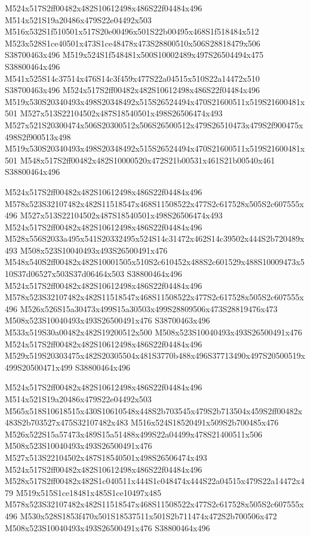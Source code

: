 \documentclass{article}
\begin{document}
\begin{multicols}{2}
M524x517S2ff00482x482S10612498x486S22f04484x496 M514x521S19a20486x479S22e04492x503 M516x532S1f510501x517S20e00496x501S22b00495x468S1f518484x512 M523x528S1ce40501x473S1ce48478x473S28800510x506S28818479x506 S38700463x496 M519x524S1f548481x500S10002489x497S26504494x475 S38800464x496 M541x525S14c37514x476S14c3f459x477S22a04515x510S22a14472x510 S38700463x496 M524x517S2ff00482x482S10612498x486S22f04484x496 M519x530S20340493x498S20348492x515S26524494x470S21600511x519S21600481x501 M527x513S22104502x487S18540501x498S26506474x493 M527x521S20300474x506S20300512x506S26500512x479S26510473x479S2f900475x498S2f900513x498 M519x530S20340493x498S20348492x515S26524494x470S21600511x519S21600481x501 M548x517S2ff00482x482S10000520x472S21b00531x461S21b00540x461 S38800464x496

M524x517S2ff00482x482S10612498x486S22f04484x496 M578x523S32107482x482S11518547x468S11508522x477S2c617528x505S2c607555x496 M527x513S22104502x487S18540501x498S26506474x493 M524x517S2ff00482x482S10612498x486S22f04484x496 M528x556S2033a495x541S20332495x524S14c31472x462S14c39502x444S2b720489x493 M508x523S10040493x493S26500491x476 M548x540S2ff00482x482S10001505x510S2c610452x488S2c601529x488S10009473x510S37d06527x503S37d06464x503 S38800464x496 M524x517S2ff00482x482S10612498x486S22f04484x496 M578x523S32107482x482S11518547x468S11508522x477S2c617528x505S2c607555x496 M526x526S15a30473x499S15a30503x499S28809506x473S28819476x473 M508x523S10040493x493S26500491x476 S38700463x496 M533x519S30a00482x482S19200512x500 M508x523S10040493x493S26500491x476 M524x517S2ff00482x482S10612498x486S22f04484x496 M529x519S20303475x482S20305504x481S3770b488x496S37713490x497S20500519x499S20500471x499 S38800464x496

M524x517S2ff00482x482S10612498x486S22f04484x496 M514x521S19a20486x479S22e04492x503 M565x518S10618515x430S10610548x448S2b703545x479S2b713504x459S2ff00482x483S2b703527x475S32107482x483 M516x524S18520491x509S2b700485x476 M526x522S15a57473x489S15a51488x499S22a04499x478S21400511x506 M508x523S10040493x493S26500491x476 M527x513S22104502x487S18540501x498S26506474x493 M524x517S2ff00482x482S10612498x486S22f04484x496 M528x517S2ff00482x482S1c040511x444S1c048474x444S22a04515x479S22a14472x479 M519x515S1ce18481x485S1ce10497x485 M578x523S32107482x482S11518547x468S11508522x477S2c617528x505S2c607555x496 M530x528S1853f470x501S18537511x501S2b711474x472S2b700506x472 M508x523S10040493x493S26500491x476 S38800464x496


\end{multicols}
\end{document}

